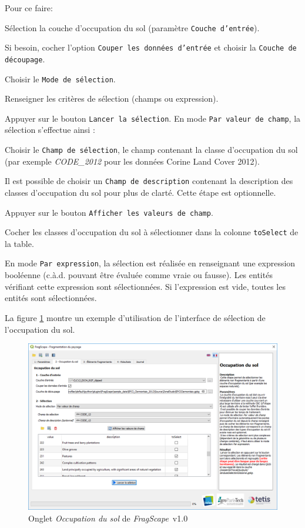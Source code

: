 \documentclass[11pt]{article}
\newcommand{\source}[1]{\vspace*{-0.4cm}\caption*{\textit{Source: {#1}}}}
\newcommand{\tool}{\emph{FragScape}}
\let\tempone\itemize
\let\temptwo\enditemize
\renewenvironment{itemize}{\tempone\addtolength{\itemsep}{-0.5\baselineskip}}{\temptwo}
\renewenvironment{enumerate}{\tempone\addtolength{\itemsep}{-0.5\baselineskip}}{\temptwo}
\begin{document}
Pour ce faire:
\begin{enumerate}
    \item Sélection la couche d'occupation du sol (paramètre \texttt{Couche d'entrée}).
    \item Si besoin, cocher l'option \texttt{Couper les données d'entrée} et choisir la \texttt{Couche de découpage}.
    \item Choisir le \texttt{Mode de sélection}.
    \item Renseigner les critères de sélection (champs ou expression).
    \item Appuyer sur le bouton \texttt{Lancer la sélection}.
\end{enumerate}
\hspace*{-0.5cm}
En mode \texttt{Par valeur de champ}, la sélection s'effectue ainsi :
\hspace*{-0.5cm}
\begin{itemize}
    \item Choisir le \texttt{Champ de sélection}, le champ contenant la classe d'occupation du sol (par exemple \textit{CODE\_2012} pour les données Corine Land Cover 2012).
    \item Il est possible de choisir un \texttt{Champ de description} contenant la description des classes d'occupation du sol pour plus de clarté. Cette étape est optionnelle.
    \item Appuyer sur le bouton \texttt{Afficher les valeurs de champ}.
    \item Cocher les classes d'occupation du sol à sélectionner dans la colonne \texttt{toSelect} de la table.
\end{itemize}

En mode \texttt{Par expression}, la sélection est réalisée en renseignant une expression booléenne (c.à.d. pouvant être évaluée comme vraie ou fausse). Les entités vérifiant cette expression sont sélectionnées. Si l'expression est vide, toutes les entités sont sélectionnées.

La figure \ref{fig:landuseTab} montre un exemple d'utilisation de l'interface de sélection de l'occupation du sol.

\begin{figure}[h!]
    \centering
    \includegraphics[scale=0.6]{pictures/landuseTabFr.png}
    \caption{Onglet \textit{Occupation du sol} de \tool\ v1.0}
    \label{fig:landuseTab}
\end{figure}
\end{document}

